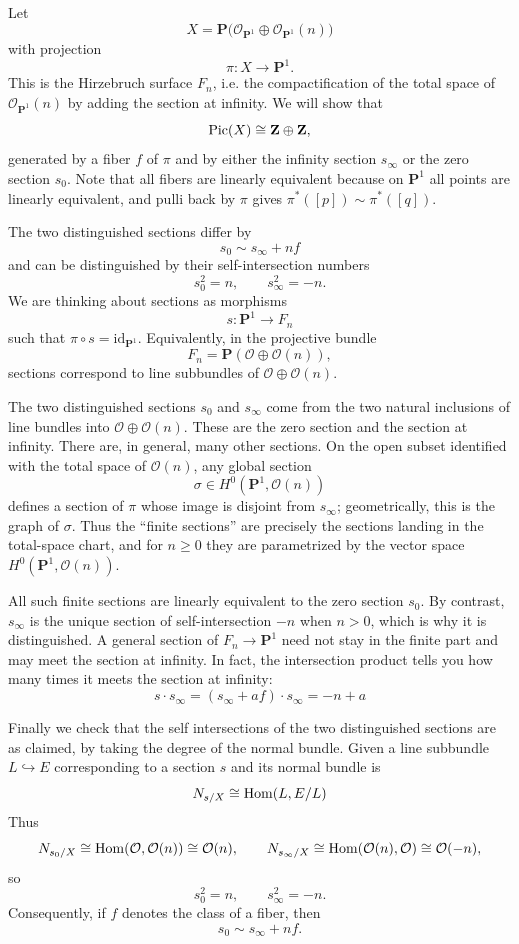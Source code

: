 \documentclass[12pt]{article}
\begin{document}
\begin{solution}
    Let
    \[
        X=\mathbf P\bigl(\mathcal O_{\mathbf P^1}\oplus \mathcal O_{\mathbf P^1}(n)\bigr)
    \]
    with projection
    \[
        \pi:X\to \mathbf P^1.
    \]
    This is the Hirzebruch surface $F_n$, i.e. the compactification of the total space of $\mathcal O_{\mathbf P^1}(n)$ by adding the section at infinity. We will show that
    \[
        \operatorname{Pic}(X)\cong \mathbf Z\oplus \mathbf Z,
    \]
    generated by a fiber $f$ of $\pi$ and by either the infinity section $s_\infty$ or the zero section $s_0$. Note that all fibers are linearly equivalent because on $\mathbf P^1$ all points are linearly equivalent, and pulli back by $\pi$ gives $\pi^*([p])\sim \pi^*([q])$.

    The two distinguished sections differ by
    \[
        s_0 \sim s_\infty + n f
    \] and can be distinguished by their self-intersection numbers
    \[
        s_0^2=n,\qquad s_\infty^2=-n.
    \]
    We are thinking about sections as morphisms
    \[
        s:\mathbf P^1\to F_n
    \]
    such that \(\pi\circ s=\mathrm{id}_{\mathbf P^1}\). Equivalently, in the projective bundle
    \[
        F_n=\mathbf P(\mathcal O\oplus \mathcal O(n)),
    \]
    sections correspond to line subbundles of \(\mathcal O\oplus \mathcal O(n)\).

    The two distinguished sections \(s_0\) and \(s_\infty\) come from the two natural inclusions of line bundles into \(\mathcal O\oplus \mathcal O(n)\). These are the zero section and the section at infinity. There are, in general, many other sections. On the open subset identified with the total space of \(\mathcal O(n)\), any global section
    \[
        \sigma\in H^0(\mathbf P^1,\mathcal O(n))
    \]
    defines a section of $\pi$ whose image is disjoint from $s_\infty$; geometrically, this is the graph of $\sigma$. Thus the ``finite sections'' are precisely the sections landing in the total-space chart, and for $n\ge 0$ they are parametrized by the vector space $H^0(\mathbf P^1,\mathcal O(n))$.

    All such finite sections are linearly equivalent to the zero section $s_0$. By contrast, $s_\infty$ is the unique section of self-intersection $-n$ when $n>0$, which is why it is distinguished. A general section of $F_n\to \mathbf P^1$ need not stay in the finite part and may meet the section at infinity. In fact, the intersection product tells you how many times it meets the section at infinity:
    \[s\cdot s_\infty = (s_\infty + af)\cdot s_\infty = -n + a\]

    Finally we check that the self intersections of the two distinguished sections are as claimed, by taking the degree of the normal bundle. Given a line subbundle \(L\hookrightarrow E\) corresponding to a section \(s\) and its normal bundle is
    \[
        N_{s/X}\cong \operatorname{Hom}(L,E/L)
    \]
    Thus
    \[
        N_{s_0/X}\cong \operatorname{Hom}(\mathcal O,\mathcal O(n))\cong \mathcal O(n),
        \qquad
        N_{s_\infty/X}\cong \operatorname{Hom}(\mathcal O(n),\mathcal O)\cong \mathcal O(-n),
    \]
    so
    \[
        s_0^2=n,\qquad s_\infty^2=-n.
    \]
    Consequently, if \(f\) denotes the class of a fiber, then
    \[
        s_0\sim s_\infty+n f.
    \]
\end{solution}
\end{document}
